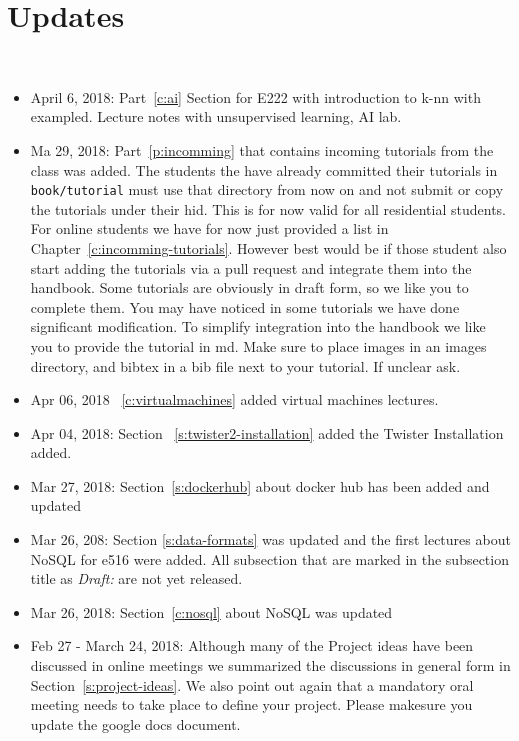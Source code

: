 
\chapter{Updates}
\FILENAME\


\begin{itemize}

\item April 6, 2018: Part~\ref{c:ai} Section for E222 with
  introduction to k-nn with exampled. Lecture notes with unsupervised
  learning, AI lab.

\item Ma 29, 2018: Part~\ref{p:incomming} that contains incoming
  tutorials from the class was added. The students the have already
  committed their tutorials in \verb|book/tutorial| must use that
  directory from now on and not submit or copy the tutorials under
  their hid. This is for now valid for all residential students.  For
  online students we have for now just provided a list in
  Chapter~\ref{c:incomming-tutorials}. However best would be if those
  student also start adding the tutorials via a pull request and
  integrate them into the handbook. Some tutorials are obviously in
  draft form, so we like you to complete them. You may have noticed in
  some tutorials we have done significant modification. To simplify
  integration into the handbook we like you to provide the tutorial in
  md. Make sure to place images in an images directory, and bibtex in
  a bib file next to your tutorial. If unclear ask.

\item Apr 06, 2018 ~\ref{c:virtualmachines} added virtual machines lectures. 
  
\item Apr 04, 2018: Section ~\ref{s:twister2-installation} added the Twister Installation added. 

\item Mar 27, 2018: Section~\ref{s:dockerhub} about docker hub has
  been added and updated

\item Mar 26, 208: Section \ref{s:data-formats} was updated and the
  first lectures about NoSQL for e516 were added. All subsection that
  are marked in the subsection title as \emph{Draft:} are not yet released.

\item Mar 26, 2018: Section~\ref{c:nosql} about NoSQL was updated

\item Feb 27 - March 24, 2018: Although many of the Project ideas have been discussed
  in online meetings we summarized the discussions in general form in
  Section~\ref{s:project-ideas}. 
  We also point out again that a mandatory oral meeting needs to take
  place to define your project. Please makesure you update the google
  docs document.


\end{itemize}
